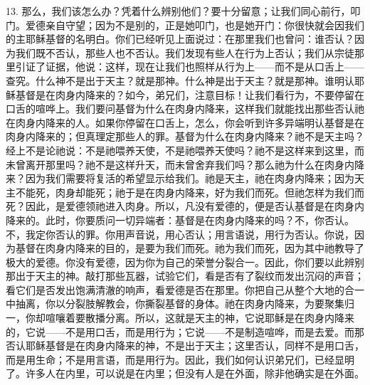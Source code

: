 13. 那么，我们该怎么办？凭着什么辨别他们？要十分留意；让我们同心前行，叩门。爱德亲自守望；因为不是别的，正是她叩门，也是她开门：你很快就会因我们的主耶稣基督的名明白。你们已经听见上面说过：在那里我们也曾问：谁否认？因为我们既不否认，那些人也不否认。我们发现有些人在行为上否认；我们从宗徒那里引证了证据，他说：这样，现在让我们也照样从行为上——而不是从口舌上——查究。什么神不是出于天主？就是那神。什么神是出于天主？就是那神。谁明认耶稣基督是在肉身内降来的？如今，弟兄们，注意目标！让我们看行为，不要停留在口舌的喧哗上。我们要问基督为什么在肉身内降来，这样我们就能找出那些否认祂在肉身内降来的人。如果你停留在口舌上，怎么，你会听到许多异端明认基督是在肉身内降来的；但真理定那些人的罪。基督为什么在肉身内降来？祂不是天主吗？经上不是论祂说：不是祂喂养天使，不是祂喂养天使吗？祂不是这样来到这里，而未曾离开那里吗？祂不是这样升天，而未曾舍弃我们吗？那么祂为什么在肉身内降来？因为我们需要将复活的希望显示给我们。祂是天主，祂在肉身内降来；因为天主不能死，肉身却能死；祂于是在肉身内降来，好为我们而死。但祂怎样为我们而死？因此，是爱德领祂进入肉身。所以，凡没有爱德的，便是否认基督是在肉身内降来的。此时，你要质问一切异端者：基督是在肉身内降来的吗？不，你否认。不，我定你否认的罪。你用声音说，用心否认；用言语说，用行为否认。你说，因为基督在肉身内降来的目的，是要为我们而死。祂为我们而死，因为其中祂教导了极大的爱德。你没有爱德，因为你为自己的荣誉分裂合一。因此，你们要以此辨别那出于天主的神。敲打那些瓦器，试验它们，看是否有了裂纹而发出沉闷的声音；看它们是否发出饱满清澈的响声，看爱德是否在那里。你把自己从整个大地的合一中抽离，你以分裂肢解教会，你撕裂基督的身体。祂在肉身内降来，为要聚集归一，你却喧嚷着要散播分离。所以，这就是天主的神，它说耶稣是在肉身内降来的，它说——不是用口舌，而是用行为；它说——不是制造喧哗，而是去爱。而那否认耶稣基督是在肉身内降来的神，不是出于天主；这里否认，同样不是用口舌，而是用生命；不是用言语，而是用行为。因此，我们如何认识弟兄们，已经显明了。许多人在内里，可以说是在内里；但没有人是在外面，除非他确实是在外面。\par

